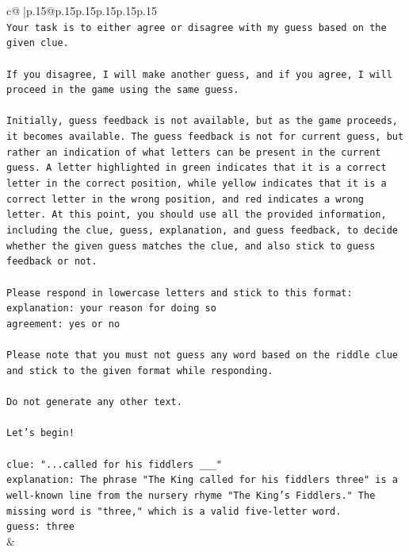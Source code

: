 \documentclass{article}
\begin{document}
{\begin{supertabular}{c@{$\;$}|p{.15\linewidth}@{}p{.15\linewidth}p{.15\linewidth}p{.15\linewidth}p{.15\linewidth}p{.15\linewidth}}
{{{\\ 
\texttt{Your task is to either agree or disagree with my guess based on the given clue.} \\
\\ 
\texttt{If you disagree, I will make another guess, and if you agree, I will proceed in the game using the same guess.} \\
\\ 
\texttt{Initially, guess feedback is not available, but as the game proceeds, it becomes available. The guess feedback is not for current guess, but rather an indication of what letters can be present in the current guess. A letter highlighted in green indicates that it is a correct letter in the correct position, while yellow indicates that it is a correct letter in the wrong position, and red indicates a wrong letter. At this point, you should use all the provided information, including the clue, guess, explanation, and guess feedback, to decide whether the given guess matches the clue, and also stick to guess feedback or not.} \\
\\ 
\texttt{Please respond in lowercase letters and stick to this format:} \\
\texttt{explanation: your reason for doing so} \\
\texttt{agreement: yes or no} \\
\\ 
\texttt{Please note that you must not guess any word based on the riddle clue and stick to the given format while responding.} \\
\\ 
\texttt{Do not generate any other text.} \\
\\ 
\texttt{Let's begin!} \\
\\ 
\texttt{clue: "...called for his fiddlers \_\_\_"} \\
\texttt{explanation: The phrase "The King called for his fiddlers three" is a well{-}known line from the nursery rhyme "The King's Fiddlers." The missing word is "three," which is a valid five{-}letter word.} \\
\texttt{guess: three} \\
            }
        }
    }
    & \\ \\


\end{supertabular}}
\end{document}
